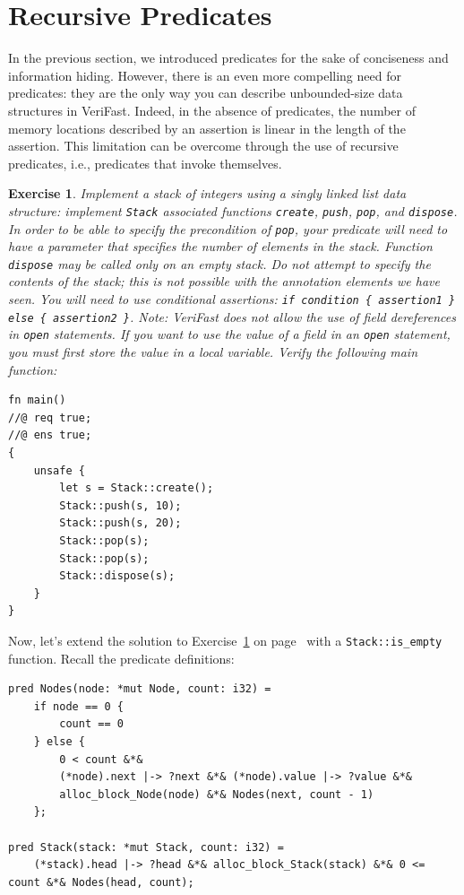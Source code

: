 \documentclass{article}
\newtheorem{exercise}{Exercise}
\begin{document}
\section{Recursive Predicates}

In the previous section, we introduced predicates for the sake
of conciseness and information hiding. However, there is an
even more compelling need for predicates: they are the only way
you can describe unbounded-size data structures in VeriFast.
Indeed, in the absence of predicates, the number of memory
locations described by an assertion is linear in the length of
the assertion. This limitation can be overcome through the use
of recursive predicates, i.e., predicates that invoke
themselves.

\begin{exercise}\label{exercise:stack}
Implement a stack of integers using a singly linked list data
structure: implement \lstinline|Stack| associated functions \lstinline!create!,
\lstinline!push!, \lstinline!pop!, and
\lstinline!dispose!. In order to be able to specify the
precondition of \lstinline!pop!, your predicate will need
to have a parameter that specifies the number of elements in
the stack. Function \lstinline!dispose! may be called
only on an empty stack. Do not attempt to specify the contents
of the stack; this is not possible with the annotation elements
we have seen. You will need to use conditional assertions:
\lstinline!if condition { assertion1 } else { assertion2 }!. Note: VeriFast
does not allow the use of field dereferences in
\lstinline!open! statements. If you want to use the value of a
field in an \lstinline!open! statement, you must first store
the value in a local variable. Verify the following main
function:
\end{exercise}
\begin{lstlisting}
fn main()
//@ req true;
//@ ens true;
{
    unsafe {
        let s = Stack::create();
        Stack::push(s, 10);
        Stack::push(s, 20);
        Stack::pop(s);
        Stack::pop(s);
        Stack::dispose(s);
    }
}
\end{lstlisting}

Now, let's extend the solution to Exercise~\ref{exercise:stack}
on page~\pageref{solution:stack} with a
\lstinline!Stack::is_empty! function. Recall the predicate
definitions:
\begin{lstlisting}
pred Nodes(node: *mut Node, count: i32) =
    if node == 0 {
        count == 0
    } else {
        0 < count &*&
        (*node).next |-> ?next &*& (*node).value |-> ?value &*&
        alloc_block_Node(node) &*& Nodes(next, count - 1)
    };

pred Stack(stack: *mut Stack, count: i32) =
    (*stack).head |-> ?head &*& alloc_block_Stack(stack) &*& 0 <= count &*& Nodes(head, count);
\end{lstlisting}
\end{document}
